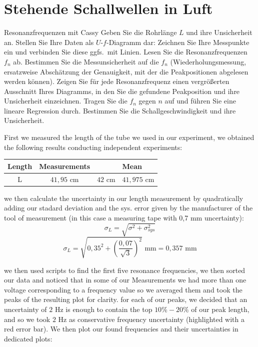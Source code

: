 \section{Stehende Schallwellen in Luft}

\begin{aufgabe}{Resonanzfrequenzen mit Cassy}
  Geben Sie die Rohrlänge $L$ und ihre Unsicherheit an. Stellen Sie
  Ihre Daten als $U$-$f$-Diagramm dar: Zeichnen Sie Ihre Messpunkte
  ein und verbinden Sie diese ggfs.~mit Linien. Lesen Sie die
  Resonanzfrequenzen $f_n$ ab. Bestimmen Sie die Messunsicherheit auf
  die $f_n$ (Wiederholungsmessung, ersatzweise Abschätzung der
  Genauigkeit, mit der die Peakpositionen abgelesen werden
  können). Zeigen Sie für jede Resonanzfrequenz einen vergrößerten
  Ausschnitt Ihres Diagramms, in den Sie die gefundene Peakposition
  und ihre Unsicherheit einzeichnen. Tragen Sie die $f_n$ gegen $n$
  auf und führen Sie eine lineare Regression durch. Bestimmen Sie die
  Schallgeschwindigkeit und ihre Unsicherheit.
\end{aufgabe}

First we measured the length of the tube we used in our experiment, we obtained the following results conducting independent experiments:
\vspace{1em}
\begin{table}[H]
  \begin{tabular}{c|cc|l}
    Length & Measurements & & Mean \\ \hline
    L & $41,95$ cm & $42$ cm & $41,975$ cm 
  \end{tabular}
\end{table}
we then calculate the uncertainty in our length measurement by quadratically adding our stadard deviation and the sys. error given by the manufacturer of the tool of measurement (in this case a measuring tape with 0,7 mm uncertainty):
$$
\sigma _{L}  =  \sqrt{ \sigma^{2} + \sigma _{sys}^{2} }
$$
$$
\sigma _{L}  =  \sqrt{ 0,35^{2} + (\frac{0,07}{\sqrt{ 3 }})^{2} } \text{ mm} = 0,357 \text{ mm}
$$



we then used scripts to find the first five resonance frequencies, we then sorted our data and noticed that in some of our Measurements we had more than one voltage corresponding to a frequency value so we averaged them and took the peaks of the resulting plot for clarity.
for each of our peaks, we decided that an uncertainty of $2$ Hz is enough to contain the top $10\%-20\%$ of our peak length, and so we took $2$ Hz as conservative frequency uncertainty (highlighted with a red error bar). We then plot our found frequencies and their uncertainties in dedicated plots:




